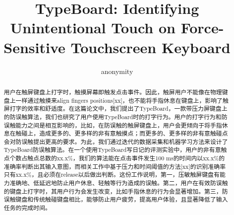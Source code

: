 \documentclass[acmlarge]{acmart}
\begin{document}
\begin{CJK*}{UTF8}{gbsn}
		

\title{TypeBoard: Identifying Unintentional Touch on Force-Sensitive Touchscreen Keyboard}

\author{anonymity}


\renewcommand{\shortauthors}{Trovato and Tobin, et al.}

\begin{abstract}

用户在触屏键盘上打字时，触摸屏幕即触发点击事件。因此，触屏用户不能像在物理键盘上一样通过触摸来align fingers positions[xx]，也不能将手指休息在键盘上，影响了触屏打字的效率和舒适度。在这篇论文中，我们提出了TypeBoard，一款带压力屏键盘上的防误触算法，我们也研究了用户使用TypeBoard时的打字行为。用户的打字行为和防误触能力之间是相互影响的，比如，在防误触的触屏键盘上，用户会更倾向于将手指休息在触碰上，造成更多的、更多样的非有意触摸点；而更多的、更多样的非有意触碰点会对防误触提出更高的要求。为此，我们通过迭代的数据采集和机器学习方法来设计了TypeBoard防误触算法。在一个使用TypeBoard写日记的评测实验中，用户的非有意触点个数占触点总数的xx.x\%，我们的算法能在点击事件发生100 ms的时间内以xx.x\%的准确率判断出其输入意图，而相关工作中基于压力和时间阈值的方法[xx]的识别准确率只有xx.x\%，且必须在release以后做出判断。这份工作说明，第一，压敏触屏键盘有能力准确地、低延迟地防止用户休息、轻触等行为造成的误触。第二，用户在有效防误触的键盘上打字时，其用户行为会发生改变，比如手指休息的行为会显著增加。第三，防误触键盘和传统触碰键盘相比，能够防止用户疲劳，提高用户体验，且显著降低了输入任务的完成时间。

\end{abstract}


\end{CJK*}
\end{document}
